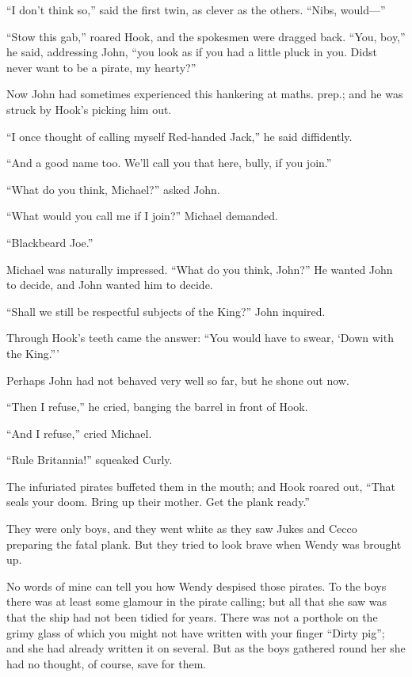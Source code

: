 ``I don't think so,'' said the first twin, as clever as the others.
``Nibs, would---''

``Stow this gab,'' roared Hook, and the spokesmen were dragged back.
``You, boy,'' he said, addressing John, ``you look as if you had a little
pluck in you. Didst never want to be a pirate, my hearty?''

Now John had sometimes experienced this hankering at maths. prep.; and
he was struck by Hook's picking him out.

``I once thought of calling myself Red-handed Jack,'' he said
diffidently.

``And a good name too. We'll call you that here, bully, if you join.''

``What do you think, Michael?'' asked John.

``What would you call me if I join?'' Michael demanded.

``Blackbeard Joe.''

Michael was naturally impressed. ``What do you think, John?'' He wanted
John to decide, and John wanted him to decide.

``Shall we still be respectful subjects of the King?'' John inquired.

Through Hook's teeth came the answer: ``You would have to swear, ‘Down
with the King.'''

Perhaps John had not behaved very well so far, but he shone out now.

``Then I refuse,'' he cried, banging the barrel in front of Hook.

``And I refuse,'' cried Michael.

``Rule Britannia!'' squeaked Curly.

The infuriated pirates buffeted them in the mouth; and Hook roared out,
``That seals your doom. Bring up their mother. Get the plank ready.''

They were only boys, and they went white as they saw Jukes and Cecco
preparing the fatal plank. But they tried to look brave when Wendy was
brought up.

No words of mine can tell you how Wendy despised those pirates. To the
boys there was at least some glamour in the pirate calling; but all
that she saw was that the ship had not been tidied for years. There was
not a porthole on the grimy glass of which you might not have written
with your finger ``Dirty pig''; and she had already written it on
several. But as the boys gathered round her she had no thought, of
course, save for them.

